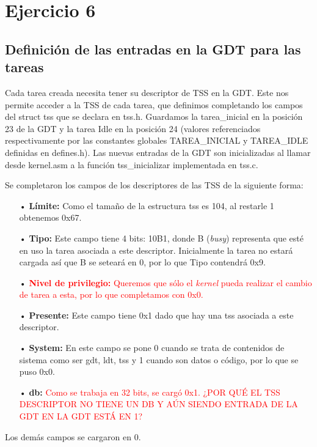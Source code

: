 \section{Ejercicio 6}
\par{}

\subsection*{Definición de las entradas en la GDT para las tareas}
\par{Cada tarea creada necesita tener su descriptor de TSS en la GDT. Este nos permite acceder a la TSS de cada tarea, que definimos completando los campos del struct tss que se declara en tss.h. Guardamos la tarea\_inicial en la posición 23 de la GDT y la tarea Idle en la posición 24 (valores referenciados respectivamente por las constantes globales TAREA\_INICIAL y TAREA\_IDLE definidas en defines.h). Las nuevas entradas de la GDT son inicializadas al llamar desde kernel.asm a la función tss\_inicializar implementada en tss.c.}

\par{Se completaron los campos de los descriptores de las TSS de la siguiente forma:}
\begin{itemize}
\item[•] \textbf{Límite:} Como el tamaño de la estructura tss es 104, al restarle 1 obtenemos 0x67.
\item[•] \textbf{Tipo:} Este campo tiene 4 bits: 10B1, donde B (\textit{busy}) representa que esté en uso la tarea asociada a este descriptor. Inicialmente la tarea no estará cargada así que B se seteará en 0, por lo que Tipo contendrá 0x9.
\item[•] \textcolor{red}{\textbf{Nivel de privilegio:} Queremos que sólo el \textit{kernel} pueda realizar el cambio de tarea a esta, por lo que completamos con 0x0.}
\item[•] \textbf{Presente:} Este campo tiene 0x1 dado que hay una tss asociada a este descriptor.
\item[•] \textbf{System:} En este campo se pone 0 cuando se trata de contenidos de sistema como ser gdt, ldt, tss y 1 cuando son datos o código, por lo que se puso 0x0.
\item[•] \textbf{db:} \textcolor{red}{Como se trabaja en 32 bits, se cargó 0x1. ¿POR QUÉ EL TSS DESCRIPTOR NO TIENE UN DB Y AÚN SIENDO ENTRADA DE LA GDT EN LA GDT ESTÁ EN 1?}
\end{itemize}
\par{Los demás campos se cargaron en 0.}


\subsection*{}
\par{}

\clearpage
